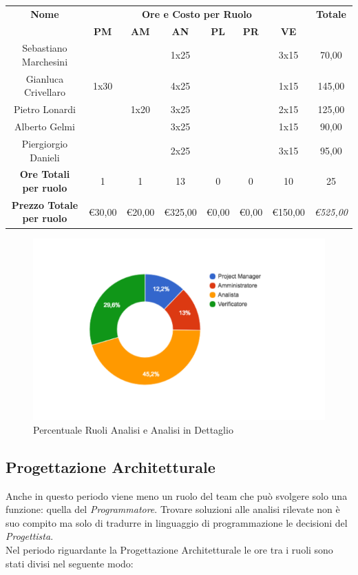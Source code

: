 \documentclass[12pt,a4paper,titlepage]{article}
\begin{document}
	{\renewcommand\arraystretch{1.2} %
		\small
		\begin{tabular}{|c|c|c|c|c|c|c|c|}
			\hline 
			\textbf{Nome} & \multicolumn{6}{c|}{\textbf{Ore e Costo per Ruolo}} & \textbf{Totale} \\ 
			& \textbf{PM} & \textbf{AM} & \textbf{AN} & \textbf{PL} & \textbf{PR} & \textbf{VE} & \textbf{} \\ 
			\hline
			Sebastiano Marchesini & & & 1x25 & & & 3x15 & 70,00 \\ 
			\hline 
			Gianluca Crivellaro & 1x30 & & 4x25 & & & 1x15 & 145,00 \\ 
			\hline 
			Pietro Lonardi & & 1x20 & 3x25 & & & 2x15 & 125,00 \\ 
			\hline 
			Alberto Gelmi & & & 3x25 & & & 1x15 & 90,00 \\ 
			\hline 
			Piergiorgio Danieli & & & 2x25 & & & 3x15 & 95,00 \\ 
			\hline
			\hline
			\textbf{Ore Totali per ruolo} & 1 & 1 & 13 & 0 & 0 & 10 & 25 \\  
			\textbf{Prezzo Totale per ruolo}&\euro 30,00&\euro 20,00&\euro 325,00&\euro 0,00&\euro 0,00&\euro 150,00& \textit{\euro 525,00} \\
			\hline  
	\end{tabular}} 

	\begin{figure}[p]
		\centering
		\includegraphics[width=0.7\linewidth]{"CiambellaAnalisi"}
		\caption{Percentuale Ruoli Analisi e Analisi in Dettaglio}
		\label{fig:ciambella-progettazione-analisi}
	\end{figure} 
	
	
	\subsection{Progettazione Architetturale}
	Anche in questo periodo viene meno un ruolo del team che può svolgere solo una funzione: quella del \textit{Programmatore}. Trovare soluzioni alle analisi rilevate non è suo compito ma solo di tradurre in linguaggio di programmazione le decisioni del \textit{Progettista}.\\
	Nel periodo riguardante la Progettazione Architetturale le ore tra i ruoli sono stati divisi nel seguente modo:\\
	
\end{document}
